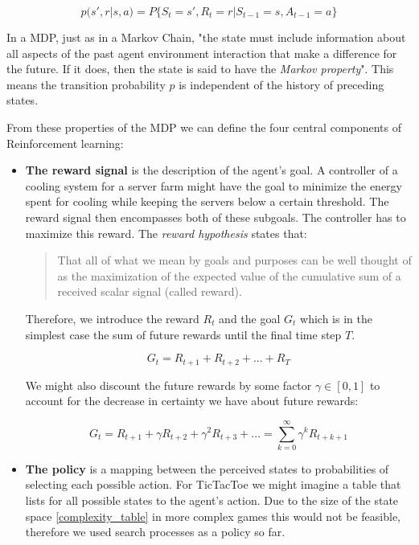 \begin{equation}
    p(s', r | s, a) = P\{S_t=s', R_t = r | S_{t-1} = s, A_{t-1}=a\}
\end{equation}

In a MDP, just as in a Markov Chain, "the state must include information about all aspects of the past agent environment interaction that make a difference for the future. If it does, then the state is said to have the \textit{Markov property}". \cite[p. 48]{sutton_reinforcement_2018} This means the transition probability $p$ is independent of the history of preceding states.

From these properties of the MDP we can define the four central components of Reinforcement learning:

\begin{itemize}
    \item \textbf{The reward signal} is the description of the agent's goal. A controller of a cooling system for a server farm might have the goal to minimize the energy spent for cooling while keeping the servers below a certain threshold. The reward signal then encompasses both of these subgoals. The controller has to maximize this reward. The \textit{reward hypothesis} states that:
          \begin{quotation}
              That all of what we mean by goals and purposes can be well thought of as the maximization of the expected value of the cumulative sum of a received scalar signal (called reward). \cite[p. 52]{sutton_reinforcement_2018}
          \end{quotation}
          Therefore, we introduce the reward $R_t $ and the goal $ G_t $ which is in the simplest case the sum of future rewards until the final time step $T$.

          \begin{equation}
              G_t = R_{t+1} + R_{t+2} + ... + R_T
          \end{equation}

          We might also discount the future rewards by some factor $\gamma \in [0, 1] $ to account for the decrease in certainty we have about future rewards:

          \begin{equation}
              G_t = R_{t+1} + \gamma R_{t+2} + \gamma^2 R_{t+3} + ... = \sum_{k=0}^{\infty} \gamma^kR_{t+k+1}
          \end{equation}

    \item \textbf{The policy} is a mapping between the perceived states to probabilities of selecting each possible action. For TicTacToe we might imagine a table that lists for all possible states to the agent's action. Due to the size of the state space \ref{complexity_table} in more complex games this would not be feasible, therefore we used search processes as a policy so far.


\end{itemize}
